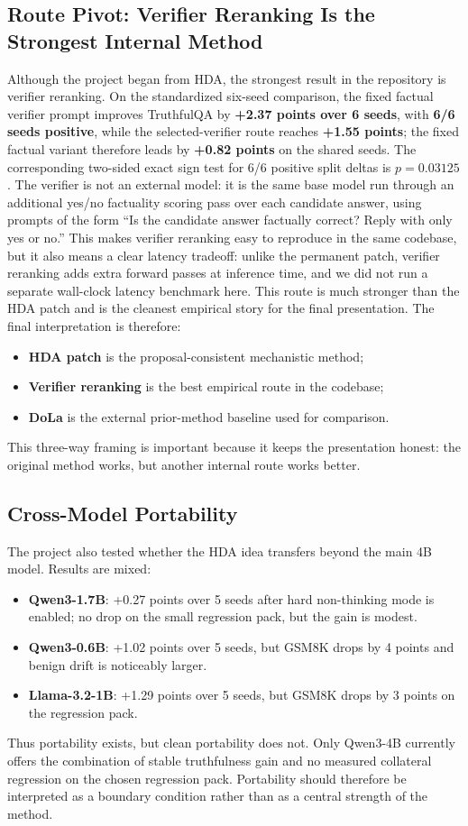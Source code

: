 \documentclass{article}
\begin{document}
\subsection{Route Pivot: Verifier Reranking Is the Strongest Internal Method}
Although the project began from HDA, the strongest result in the repository is verifier reranking. On the standardized six-seed comparison, the fixed factual verifier prompt improves TruthfulQA by \textbf{+2.37 points over 6 seeds}, with \textbf{6/6 seeds positive}, while the selected-verifier route reaches \textbf{+1.55 points}; the fixed factual variant therefore leads by \textbf{+0.82 points} on the shared seeds. The corresponding two-sided exact sign test for 6/6 positive split deltas is $p=0.03125$. The verifier is not an external model: it is the same base model run through an additional yes/no factuality scoring pass over each candidate answer, using prompts of the form ``Is the candidate answer factually correct? Reply with only yes or no.'' This makes verifier reranking easy to reproduce in the same codebase, but it also means a clear latency tradeoff: unlike the permanent patch, verifier reranking adds extra forward passes at inference time, and we did not run a separate wall-clock latency benchmark here. This route is much stronger than the HDA patch and is the cleanest empirical story for the final presentation. The final interpretation is therefore:
\begin{itemize}
\item \textbf{HDA patch} is the proposal-consistent mechanistic method;
\item \textbf{Verifier reranking} is the best empirical route in the codebase;
\item \textbf{DoLa} is the external prior-method baseline used for comparison.
\end{itemize}
This three-way framing is important because it keeps the presentation honest: the original method works, but another internal route works better.

\subsection{Cross-Model Portability}
The project also tested whether the HDA idea transfers beyond the main 4B model. Results are mixed:
\begin{itemize}
\item \textbf{Qwen3-1.7B}: +0.27 points over 5 seeds after hard non-thinking mode is enabled; no drop on the small regression pack, but the gain is modest.
\item \textbf{Qwen3-0.6B}: +1.02 points over 5 seeds, but GSM8K drops by 4 points and benign drift is noticeably larger.
\item \textbf{Llama-3.2-1B}: +1.29 points over 5 seeds, but GSM8K drops by 3 points on the regression pack.
\end{itemize}
Thus portability exists, but clean portability does not. Only Qwen3-4B currently offers the combination of stable truthfulness gain and no measured collateral regression on the chosen regression pack. Portability should therefore be interpreted as a boundary condition rather than as a central strength of the method.
\end{document}

